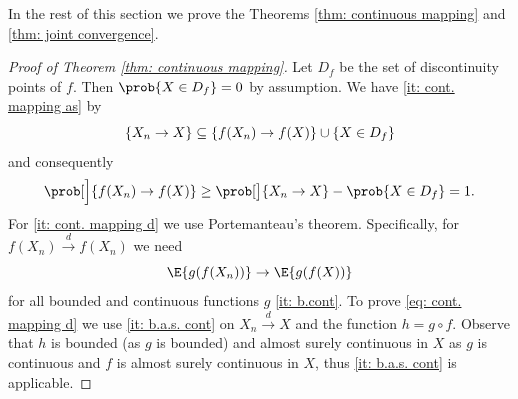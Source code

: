 In the rest of this section we prove the Theorems \ref{thm: continuous mapping}
and \ref{thm: joint convergence}.

\begin{proof}[Proof of Theorem \ref{thm: continuous mapping}]
    Let \(D_f\) be the set of discontinuity points of \(f\).
    Then
    \(\prob{X \in D_f} = 0\) by assumption. We have \ref{it: cont. mapping as}
    by
    \[
        \{X_n \to X\} \subseteq \{f(X_n) \to f(X)\} \cup \{X \in D_f\}
    \]
    and consequently
    \[
        \prob[\Big]{f(X_n) \to f(X)}
        \ge \prob[\big]{X_n \to X} - \prob{X \in D_f} = 1.
    \]
    For \ref{it: cont. mapping d} we use Portemanteau's theorem.
    Specifically, for \(f(X_n) \overset{d}\to f(X_n)\) we need
    \begin{equation}
        \label{eq: cont. mapping d}    
        \E{g(f(X_n))} \to \E{g(f(X))}
    \end{equation}
    for all bounded and continuous functions \(g\) \ref{it: b.cont}. To prove
    \eqref{eq: cont. mapping d} we use \ref{it: b.a.s. cont} on \(X_n
    \overset{d}\to X\) and the function \(h=g\circ f\). Observe that \(h\) is
    bounded (as \(g\) is bounded) and almost surely continuous in \(X\) as \(g\)
    is continuous and \(f\) is almost surely continuous in \(X\), thus \ref{it:
    b.a.s. cont} is applicable.
    

\end{proof}
